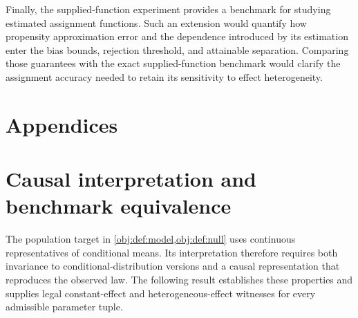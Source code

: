 \documentclass[11pt]{article}
\begin{document}
Finally, the supplied-function experiment provides a benchmark for studying estimated assignment functions. Such an extension would quantify how propensity approximation error and the dependence introduced by its estimation enter the bias bounds, rejection threshold, and attainable separation. Comparing those guarantees with the exact supplied-function benchmark would clarify the assignment accuracy needed to retain its sensitivity to effect heterogeneity.


\appendix

\section*{Appendices}

\section{Causal interpretation and benchmark equivalence}

The population target in \cref{obj:def:model,obj:def:null} uses continuous representatives of conditional means. Its interpretation therefore requires both invariance to conditional-distribution versions and a causal representation that reproduces the observed law. The following result establishes these properties and supplies legal constant-effect and heterogeneous-effect witnesses for every admissible parameter tuple.
\end{document}
